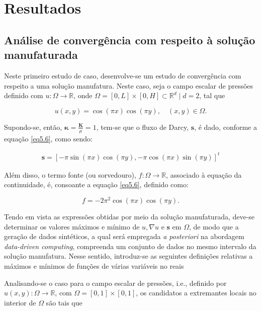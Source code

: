 \section{Resultados}


\subsection{Análise de convergência com respeito à solução manufaturada}

Neste primeiro estudo de caso, desenvolve-se um estudo de convergência com respeito a uma solução manufatura. Neste caso, seja o campo escalar de pressões definido com $ u: \Omega \rightarrow \mathbb{R}$, onde $\Omega = [0,L] \times [0,H] \subset \mathbb{R}^{d} \mid d = 2$, tal que

\begin{equation}
	u(x,y) = \cos(\pi x ) \cos(\pi y), \quad (x,y) \in \Omega.
\end{equation}


Supondo-se, então, $ \boldsymbol{\kappa} = \frac{\mathbf{K}}{\mu} = 1$, tem-se que o fluxo de Darcy, $ \mathbf{s} $, é dado, conforme a equação \ref{eq5.6}, como sendo:

\begin{equation}
	\begin{aligned}
		\mathbf{s} =[-\pi \sin(\pi x)\cos(\pi y), -\pi \cos(\pi x) \sin(\pi y)]^{t}
	\end{aligned}
\end{equation} 


Além disso, o termo fonte (ou sorvedouro), $ f: \Omega \rightarrow \mathbb{R} $, associado à equação da continuidade, é, consoante a equação \ref{eq5.6}, definido como:

\begin{equation}
	f = -2\pi^{2} \cos(\pi x) \cos(\pi y).
\end{equation}


Tendo em vista as expressões obtidas por meio da solução manufaturada, deve-se determinar os valores máximos e mínimo de $ u, \nabla u $ e $ \mathbf{s} $ em $ \Omega $, de modo que a geração de dados sintéticos, a qual será empregada \textit{a posteriori} na abordagem \textit{data-driven computing}, compreenda um conjunto de dados no mesmo intervalo da solução manufatura. Nesse sentido, introduz-se as seguintes definições relativas a máximos e mínimos de funções de várias variáveis no reais

\newpage


Analisando-se o caso para o campo escalar de pressões, i.e., definido por $ u(x,y) : \Omega \rightarrow \mathbb{R} $, com $\Omega = [0,1] \times [0,1]$, os candidatos a extremantes locais no interior de $ \Omega $ são tais que

